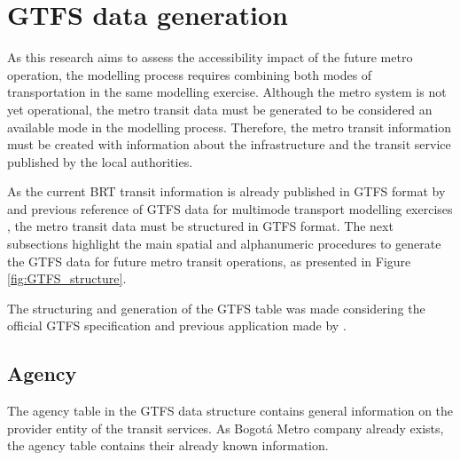 \documentclass[12pt, a4paper]{report}
\begin{document}
\section{GTFS data generation}

As this research aims to assess the accessibility impact of the future metro operation, the modelling process requires combining both modes of transportation in the same modelling exercise. Although the metro system is not yet operational, the metro transit data must be generated to be considered an available mode in the modelling process. Therefore, the metro transit information must be created with information about the infrastructure and the transit service published by the local authorities.

As the current BRT transit information is already published in GTFS format by \citep{alcaldiadebogotad.c.EstacionesPrimeraLinea2022,alcaldiadebogotad.c.TrazadoPrimeraLinea2022} and previous reference of GTFS data for multimode transport modelling exercises \citep{pereiraIntroductionUrbanAccessibility2023a}, the metro transit data must be structured in GTFS format. The next subsections highlight the main spatial and alphanumeric procedures to generate the GTFS data for future metro transit operations, as presented in Figure \ref{fig:GTFS_structure}.

The structuring and generation of the GTFS table was made considering the official GTFS specification \citep{mobiltydataGeneralTransitFeed2023} and previous application made by \cite{pereiraIntroductionUrbanAccessibility2023a}.

\subsection{Agency}

The agency table in the GTFS data structure contains general information on the provider entity of the transit services. As Bogotá Metro company already exists, the agency table contains their already known information.


\begin{table}[ht]
\centering
\renewcommand{\arraystretch}{1.5}
\caption{Metro agency table.}
\label{tab:Metro_Agency}
\end{table}
\end{document}
